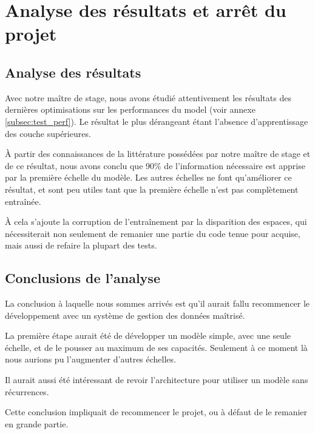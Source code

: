 \section{Analyse des résultats et arrêt du projet}\label{white_flag}



\subsection{Analyse des résultats}
Avec notre maître de stage, nous avons étudié attentivement les résultats des dernières optimisations sur les performances du \gls{model} (voir annexe \ref{subsec:test_perf}). 
Le résultat le plus dérangeant étant l'absence d'apprentissage des couche supérieures.

À partir des connaissances de la littérature possédées par notre maître de stage et de ce résultat, nous avons conclu que 90\% de l'information nécessaire est apprise par la première échelle du modèle. Les autres échelles ne font qu'améliorer ce résultat, et sont peu utiles tant que la première échelle n'est pas complètement entraînée.

À cela s'ajoute la corruption de l'entraînement par la disparition des espaces, qui nécessiterait non seulement de remanier une partie du code tenue pour acquise, mais aussi de refaire la plupart des tests. %

\subsection{Conclusions de l'analyse} %
La conclusion à laquelle nous sommes arrivés est qu'il aurait fallu recommencer le développement avec un système de gestion des données maîtrisé.

La première étape aurait été de développer un modèle simple, avec une seule échelle, et de le pousser au maximum de ses capacités. Seulement à ce moment là nous aurions pu l'augmenter d'autres échelles.

Il aurait aussi été intéressant de revoir l'architecture pour utiliser un modèle sans récurrences.

Cette conclusion impliquait de recommencer le projet, ou à défaut de le remanier en grande partie.

